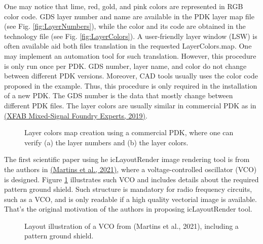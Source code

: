 \documentclass[10pt,a4paper,onecolumn]{article}
\begin{document}
One may notice that lime, red, gold, and pink colors are represented in
RGB color code. GDS layer number and name are available in the PDK layer
map file (see Fig. \ref{fig:LayerNumbers}), while the color and its code are obtained in
the technology file (see Fig. \ref{fig:LayerColors}). A user-friendly layer window (LSW)
is often available aid both files translation in the requested
LayerColors.map. One may implement an automation tool for such
translation. However, this procedure is only run once per PDK. GDS
number, layer name, and color do not change between different PDK
versions. Moreover, CAD tools usually uses the color code proposed in
the example. Thus, this procedure is only required in the installation
of a new PDK. The GDS number is the data that mostly change between
different PDK files. The layer colors are usually similar in commercial PDK as in \hyperlink{ref-XFAB2019}{(XFAB Mixed-Signal Foundry Experts, 2019)}.
\begin{figure}[ht]
 \begin{center}
   \caption{Layer colors map creation using a commercial PDK, where one can verify (a) the layer numbers and (b) the layer colors.}
 \end{center}
\end{figure}

The first scientific paper using he icLayoutRender image rendering tool is from the authors in
 \hyperlink{ref-Martins2021}{(Martins et al., 2021)}, where a voltage-controlled oscillator (VCO) 
is designed. Figure \ref{fig:VCO_color} illustrates such VCO and includes details about the required 
pattern ground shield. Such structure is mandatory for radio frequency circuits, such as a VCO, and 
is only readable if a high quality vectorial image is available. That's the original motivation of the 
authors in proposing icLayoutRender tool. 
\begin{figure}[ht]
\begin{center}
\caption{Layout illustration of a VCO from (Martins et al., 2021), including a pattern ground shield.}
\label{fig:VCO_color}
\end{center}\end{figure}
\end{document}
